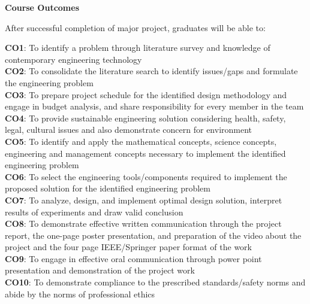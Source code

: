 \begin{titlepage}
\begin{center}
{\Large \textbf{Course Outcomes}}
\end{center}

After successful completion of major project, graduates will be able to:

{\small 
\textbf{CO1}: To identify a problem through literature survey and knowledge of contemporary engineering technology \\      

\textbf{CO2}: To consolidate the literature search to identify issues/gaps and formulate the engineering problem \\

\textbf{CO3}: To prepare project schedule for the identified design methodology and engage in budget analysis, and share responsibility for every member in the team\\

\textbf{CO4}: To provide sustainable engineering solution considering health, safety, legal, cultural issues and also demonstrate concern for environment \\

\textbf{CO5}: To identify and apply the mathematical concepts, science concepts, engineering and management concepts necessary to implement the identified engineering problem \\

\textbf{CO6}: To select the engineering tools/components required to implement the proposed solution for the identified engineering problem\\

\textbf{CO7}: To analyze, design, and implement optimal design solution, interpret results of experiments and draw valid conclusion \\

\textbf{CO8}: To demonstrate effective written communication through the project report, the one-page poster presentation, and preparation of the video about the project and the four page IEEE/Springer paper format of the work\\

\textbf{CO9}: To engage in effective oral communication through power point presentation and demonstration of the project work\\ 

\textbf{CO10}: To demonstrate compliance to the prescribed standards/safety norms and abide by the norms of professional ethics\\

}
\end{titlepage}
